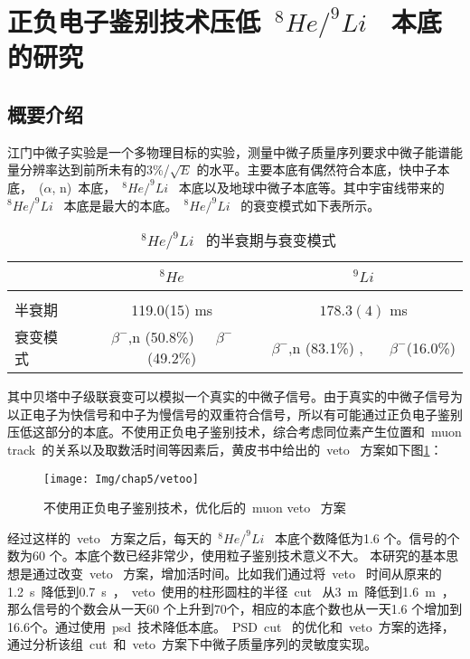 \section{正负电子鉴别技术压低~$^{8}He/^{9}Li$~ 本底的研究}
\subsection{概要介绍}
江门中微子实验是一个多物理目标的实验，测量中微子质量序列要求中微子能谱能量分辨率达到前所未有的3\%/$\sqrt{E}$ 的水平。主要本底有偶然符合本底，快中子本底，~($\alpha$, n)~本底，~$^{8}He/^{9}Li$~ 本底以及地球中微子本底等。其中宇宙线带来的~$^{8}He/^{9}Li$~ 本底是最大的本底。~$^{8}He/^{9}Li$~ 的衰变模式如下表所示。

\begin{table}[htbp]
\centering  %
\begin{tabular}{lcc}  %
\hline
&~$^{8}He$~&~$^{9}Li$~ \\ \hline  %
\\ 半衰期&119.0(15) ms& $178.3(4)$ ms       %
\\ 衰变模式&$\beta^{-}$,n (50.8\%)~~~$\beta^{-}$(49.2\%) & $\beta^{-}$,n (83.1\%) , ~~~$\beta^{-}$(16.0\%)   %
\\ \hline
\end{tabular}
\caption{~$^{8}He/^{9}Li$~ 的半衰期与衰变模式}
\end{table}
其中贝塔中子级联衰变可以模拟一个真实的中微子信号。由于真实的中微子信号为以正电子为快信号和中子为慢信号的双重符合信号，所以有可能通过正负电子鉴别压低这部分的本底。不使用正负电子鉴别技术，综合考虑同位素产生位置和~muon track~的关系以及取数活时间等因素后，黄皮书中给出的~veto~ 方案如下图\ref{fig:p512}：
\begin{figure}[!htbp]
  \centering
   \texttt{[image: Img/chap5/vetoo]}
    \caption{不使用正负电子鉴别技术，优化后的~muon veto~ 方案\citep{an2015neutrino}}
  \label{fig:p512}
\end{figure}
经过这样的~veto~ 方案之后，每天的~$^{8}He/^{9}Li$~ 本底个数降低为1.6 个。信号的个数为60 个。本底个数已经非常少，使用粒子鉴别技术意义不大。
本研究的基本思想是通过改变~veto~ 方案，增加活时间。比如我们通过将~veto~ 时间从原来的1.2~s~降低到0.7~s~，~veto~使用的柱形圆柱的半径~cut~ 从3~m~降低到1.6~m~，那么信号的个数会从一天60 个上升到70个，相应的本底个数也从一天1.6 个增加到16.6个。通过使用~psd~技术降低本底。~PSD~cut~ 的优化和~veto~方案的选择，通过分析该组~cut~和~veto~方案下中微子质量序列的灵敏度实现。
